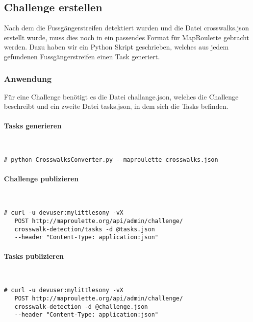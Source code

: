 \subsection{Challenge erstellen}
Nach dem die Fussgängerstreifen detektiert wurden und die Datei crosswalks.json erstellt wurde, muss dies noch in ein passendes Format für MapRoulette gebracht werden. Dazu haben wir ein Python Skript geschrieben, welches aus jedem gefundenen Fussgängerstreifen einen Task generiert.

\subsubsection{Anwendung}
Für eine Challenge benötigt es die Datei challange.json, welches die Challenge beschreibt und ein zweite Datei tasks.json, in dem sich die Tasks befinden.\\

\paragraph{Tasks generieren}\mbox{}\\
\begin{lstlisting}[style=BashInputStyle]
 # python CrosswalksConverter.py --maproulette crosswalks.json
\end{lstlisting}

\paragraph{Challenge publizieren}\mbox{}\\
\begin{lstlisting}[style=BashInputStyle]
 # curl -u devuser:mylittlesony -vX
   POST http://maproulette.org/api/admin/challenge/
   crosswalk-detection/tasks -d @tasks.json
   --header "Content-Type: application:json"
\end{lstlisting}

\paragraph{Tasks publizieren}\mbox{}\\
\begin{lstlisting}[style=BashInputStyle]
 # curl -u devuser:mylittlesony -vX
   POST http://maproulette.org/api/admin/challenge/
   crosswalk-detection -d @challenge.json
   --header "Content-Type: application:json"
\end{lstlisting}



